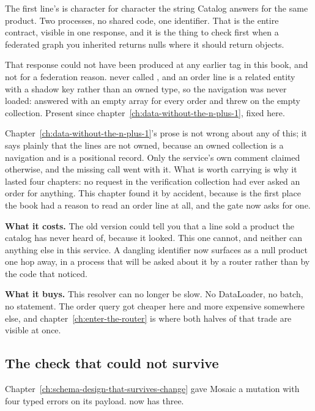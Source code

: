 The first line's  is character for character the string Catalog
answers for the same product. Two processes, no shared code, one identifier.
That is the entire contract, visible in one response, and it is the thing to
check first when a federated graph you inherited returns nulls where it should
return objects.

%
That response could not have been produced at any earlier tag in this book, and
not for a federation reason.  never called
, and an order line is a related entity with a
shadow key rather than an owned type, so the navigation was never loaded:
 answered with an empty array for every order and  threw
on the empty collection. Present since
chapter~\ref{ch:data-without-the-n-plus-1}, fixed here.

Chapter~\ref{ch:data-without-the-n-plus-1}'s prose is not wrong about any of
this; it says plainly that the lines are not owned, because an owned collection
is a navigation and  is a positional record. Only the service's
own comment claimed otherwise, and the missing call went with it. What is worth
carrying is why it lasted four chapters: no request in the verification
collection had ever asked an order for anything. This chapter found it by
accident, because  is the first place the book had a
reason to read an order line at all, and the gate now asks for one.

\medskip\noindent\textbf{What it costs.} The old version could tell you that a
line sold a product the catalog has never heard of, because it looked. This one
cannot, and neither can anything else in this service. A dangling identifier now
surfaces as a null product one hop away, in a process that will be asked about
it by a router rather than by the code that noticed.

\medskip\noindent\textbf{What it buys.} This resolver can no longer be slow. No
DataLoader, no batch, no statement. The order query got cheaper here and more
expensive somewhere else, and chapter~\ref{ch:enter-the-router} is where both
halves of that trade are visible at once.

\subsection*{The check that could not survive}

%
Chapter~\ref{ch:schema-design-that-survives-change} gave Mosaic a mutation with
four typed errors on its payload.  now has three.

